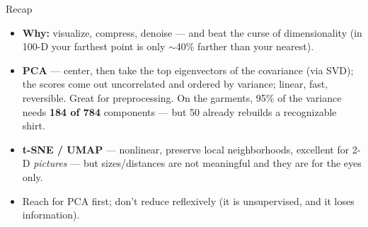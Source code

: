 \documentclass[aspectratio=169]{beamer}
\begin{document}
\begin{frame}{Recap}
  \begin{itemize}\small
    \item \textbf{Why:} visualize, compress, denoise --- and beat the curse of dimensionality
      (in 100-D your farthest point is only $\sim$40\% farther than your nearest).
    \item \textbf{PCA} --- center, then take the top eigenvectors of the covariance (via SVD);
      the scores come out uncorrelated and ordered by variance; linear, fast, reversible.
      Great for preprocessing. On the garments, 95\% of the variance needs \textbf{184 of 784}
      components --- but 50 already rebuilds a recognizable shirt.
    \item \textbf{t-SNE / UMAP} --- nonlinear, preserve local neighborhoods, excellent for 2-D
      \emph{pictures} --- but sizes/distances are not meaningful and they are for the eyes only.
    \item Reach for PCA first; don't reduce reflexively (it is unsupervised, and it loses information).
  \end{itemize}
  \vfill
\end{frame}
\end{document}
